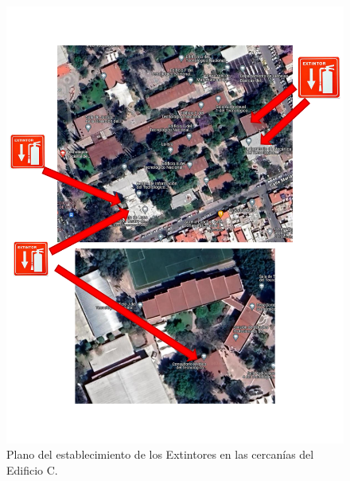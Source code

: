 \begin{figure}[H]
    \centering
    \includegraphics[trim = {0mm 25mm 0mm 12mm},clip,scale=0.3]{19/Img/planoLocalizadorExtintor.pdf}
    \caption{Plano del establecimiento de los Extintores en las cercanías del Edificio C.}
    \label{fig:planoLocalizadorExtintor}
\end{figure}

